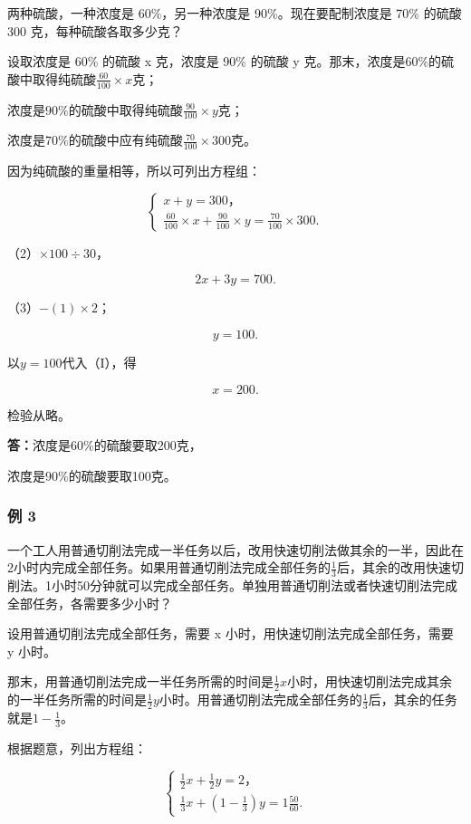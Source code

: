 两种硫酸，一种浓度是 60\%，另一种浓度是 90\%。现在要配制浓度是 70\%
的硫酸 300 克，每种硫酸各取多少克？

 设取浓度是 60\% 的硫酸 x 克，浓度是 90\% 的硫酸 y
克。那末，浓度是\(60\%\)的硫酸中取得纯硫酸\(\frac{60}{100} \times x\)克；

浓度是\(90\%\)的硫酸中取得纯硫酸\(\frac{90}{100} \times y\)克；

浓度是\(70\%\)的硫酸中应有纯硫酸\(\frac{70}{100} \times 300\)克。

因为纯硫酸的重量相等，所以可列出方程组：

\[
\left\{ \begin{array}{l} x + y = 300\text{，} \\ \frac{60}{100} \times x + \frac{90}{100} \times y = \frac{70}{100} \times 300. \end{array} \right. \tag{1}
\]

（2）\(\times 100 \div 30\)，

\[
2 x + 3 y = 700. \tag{3}
\]

（3）\(-(1) \times 2\)；

\[
y = 100.
\]

以\(y = 100\)代入（I），得

\[
x = 200.
\]

检验从略。

\textbf{答：}浓度是\(60\%\)的硫酸要取200克，

浓度是\(90\%\)的硫酸要取100克。

\subsubsection{例 3}

一个工人用普通切削法完成一半任务以后，改用快速切削法做其余的一半，因此在2小时内完成全部任务。如果用普通切削法完成全部任务的\(\frac{1}{3}\)后，其余的改用快速切削法。1小时50分钟就可以完成全部任务。单独用普通切削法或者快速切削法完成全部任务，各需要多少小时？

 设用普通切削法完成全部任务，需要 x
小时，用快速切削法完成全部任务，需要 y 小时。

那末，用普通切削法完成一半任务所需的时间是\(\frac{1}{2} x\)小时，用快速切削法完成其余的一半任务所需的时间是\(\frac{1}{2} y\)小时。用普通切削法完成全部任务的\(\frac{1}{3}\)后，其余的任务就是\(1 - \frac{1}{3}\)。

根据题意，列出方程组：

\[
\left\{ \begin{array}{l} \frac{1}{2} x + \frac{1}{2} y = 2\text{，} \\ \frac{1}{3} x + \left(1 - \frac{1}{3}\right) y = 1 \frac{50}{60}. \end{array} \right. \tag{3}
\]

